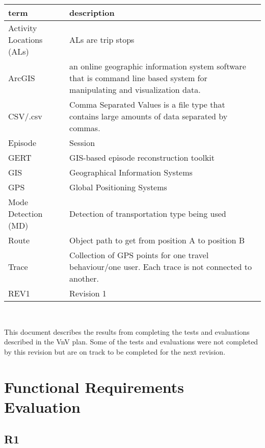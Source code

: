 \documentclass[12pt, titlepage]{article}
\begin{document}
\begin{tabular}{l p{6cm}} 
  \toprule		
  \textbf{term} & \textbf{description}\\
  \midrule 
  Activity Locations (ALs) & ALs are trip stops \\
  ArcGIS & an online geographic information system software that is command line based system for manipulating and visualization data.\\
  CSV/.csv & Comma Separated Values is a file type that contains large amounts of data separated by commas. \\
  Episode & Session\\
  GERT & GIS-based episode reconstruction toolkit \\
  GIS & Geographical Information Systems\\
  GPS & Global Positioning Systems\\
  Mode Detection (MD) & Detection of transportation type being used \\
  Route & Object path to get from position A to position B\\
  Trace & Collection of GPS points for one travel behaviour/one user. Each trace is not connected to another.\\
  REV1 & Revision 1\\
  
  \bottomrule
\end{tabular}\\


\newpage

\tableofcontents

\listoftables %

\listoffigures %

\newpage


This document describes the results from completing the tests and evaluations described in the VnV plan. Some of the tests and evaluations were not completed by this revision but are on track to be completed for the next revision. 

\section{Functional Requirements Evaluation}
\subsection{R1}
\end{document}
